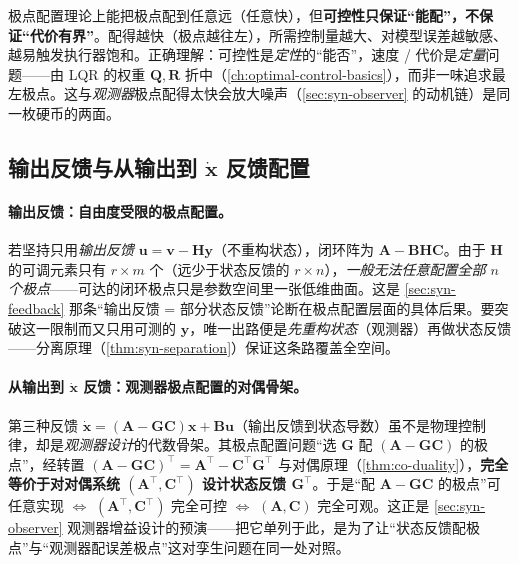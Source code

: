 \begin{pitfall}[把“可控”当成“能任意快地驱动”]
极点配置理论上能把极点配到任意远（任意快），但\textbf{可控性只保证“能配”，不保证“代价有界”}。配得越快（极点越往左），所需控制量越大、对模型误差越敏感、越易触发执行器饱和。正确理解：可控性是\emph{定性}的“能否”，速度 / 代价是\emph{定量}问题——由 LQR 的权重 $\mathbf Q,\mathbf R$ 折中（\cref{ch:optimal-control-basics}），而非一味追求最左极点。这与\emph{观测器}极点配得太快会放大噪声（\cref{sec:syn-observer} 的动机链）是同一枚硬币的两面。
\end{pitfall}

\subsection{输出反馈与从输出到 \texorpdfstring{$\dot{\mathbf x}$}{x-dot} 反馈配置}
\label{sec:syn-output-pole}

\paragraph{输出反馈：自由度受限的极点配置。}
若坚持只用\emph{输出反馈} $\mathbf u=\mathbf v-\mathbf H\mathbf y$（不重构状态），闭环阵为 $\mathbf A-\mathbf B\mathbf H\mathbf C$。由于 $\mathbf H$ 的可调元素只有 $r\times m$ 个（远少于状态反馈的 $r\times n$），\emph{一般无法任意配置全部 $n$ 个极点}——可达的闭环极点只是参数空间里一张低维曲面。这是 \cref{sec:syn-feedback} 那条“输出反馈 = 部分状态反馈”论断在极点配置层面的具体后果。要突破这一限制而又只用可测的 $\mathbf y$，唯一出路便是\emph{先重构状态}（观测器）再做状态反馈——分离原理（\cref{thm:syn-separation}）保证这条路覆盖全空间。

\paragraph{从输出到 $\dot{\mathbf x}$ 反馈：观测器极点配置的对偶骨架。}
第三种反馈 $\dot{\mathbf x}=(\mathbf A-\mathbf G\mathbf C)\mathbf x+\mathbf B\mathbf u$（输出反馈到状态导数）虽不是物理控制律，却是\emph{观测器设计}的代数骨架。其极点配置问题“选 $\mathbf G$ 配 $(\mathbf A-\mathbf G\mathbf C)$ 的极点”，经转置 $(\mathbf A-\mathbf G\mathbf C)^\top=\mathbf A^\top-\mathbf C^\top\mathbf G^\top$ 与对偶原理（\cref{thm:co-duality}），\textbf{完全等价于对对偶系统 $(\mathbf A^\top,\mathbf C^\top)$ 设计状态反馈 $\mathbf G^\top$}\cite{liubao2006modern}。于是“配 $\mathbf A-\mathbf G\mathbf C$ 的极点”可任意实现 $\iff$ $(\mathbf A^\top,\mathbf C^\top)$ 完全可控 $\iff$ $(\mathbf A,\mathbf C)$ 完全可观。这正是 \cref{sec:syn-observer} 观测器增益设计的预演——把它单列于此，是为了让“状态反馈配极点”与“观测器配误差极点”这对孪生问题在同一处对照。


